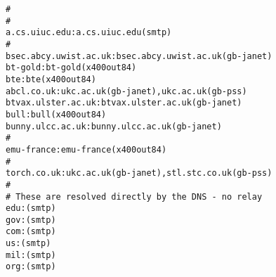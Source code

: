 \small\begin{verbatim}
#
#
a.cs.uiuc.edu:a.cs.uiuc.edu(smtp)
#
bsec.abcy.uwist.ac.uk:bsec.abcy.uwist.ac.uk(gb-janet)
bt-gold:bt-gold(x400out84)
bte:bte(x400out84)
abcl.co.uk:ukc.ac.uk(gb-janet),ukc.ac.uk(gb-pss)
btvax.ulster.ac.uk:btvax.ulster.ac.uk(gb-janet)
bull:bull(x400out84)
bunny.ulcc.ac.uk:bunny.ulcc.ac.uk(gb-janet)
#
emu-france:emu-france(x400out84)
#
torch.co.uk:ukc.ac.uk(gb-janet),stl.stc.co.uk(gb-pss)
#
# These are resolved directly by the DNS - no relay
edu:(smtp)
gov:(smtp)
com:(smtp)
us:(smtp)
mil:(smtp)
org:(smtp)
\end{verbatim}
